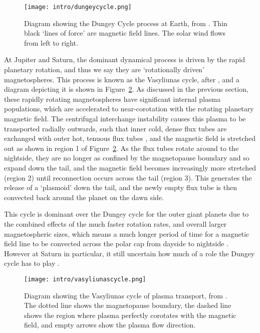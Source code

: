 \begin{figure}
\centering
\noindent\texttt{[image: intro/dungeycycle.png]}
\caption[Diagram of the Dungey cycle.]{Diagram showing the Dungey Cycle process at Earth, from \citet{dungey1961}. Thin black `lines of force' are magnetic field lines. The solar wind flows from left to right.}
\label{intro:fig:dungeycycle}
\end{figure}

At Jupiter and Saturn, the dominant dynamical process is driven by the rapid planetary rotation, and thus we say they are `rotationally driven' magnetospheres. This process is known as the Vasyliunas cycle, after \citet{vasyliunas1983}, and a diagram depicting it is shown in Figure~\ref{intro:fig:vasyliunascycle}. As discussed in the previous section, these rapidly rotating magnetospheres have significant internal plasma populations, which are accelerated to near-corotation with the rotating planetary magnetic field. The centrifugal interchange instability causes this plasma to be transported radially outwards, such that inner cold, dense flux tubes are exchanged with outer hot, tenuous flux tubes \citep{southwood1989}, and the magnetic field is stretched out as shown in region 1 of Figure~\ref{intro:fig:vasyliunascycle}. As the flux tubes rotate around to the nightside, they are no longer as confined by the magnetopause boundary and so expand down the tail, and the magnetic field becomes increasingly more stretched (region 2) until reconnection occurs across the tail (region 3). This generates the release of a `plasmoid' down the tail, and the newly empty flux tube is then convected back around the planet on the dawn side. 

This cycle is dominant over the Dungey cycle for the outer giant planets due to the combined effects of the much faster rotation rates, and overall larger magnetospheric sizes, which means a much longer period of time for a magnetic field line to be convected across the polar cap from dayside to nightside \citep{forsyth2010}. However at Saturn in particular, it still uncertain how much of a role the Dungey cycle has to play \citep[e.g.][]{cowley2005}.

\begin{figure}
\centering
\noindent\texttt{[image: intro/vasyliunascycle.png]}
\caption[Diagram of the Vasyliunas cycle.]{Diagram showing the Vasyliunas cycle of plasma transport, from \citet{vasyliunas1983}. The dotted line shows the magnetopause boundary, the dashed line shows the region where plasma perfectly corotates with the magnetic field, and empty arrows show the plasma flow direction.}
\label{intro:fig:vasyliunascycle}
\end{figure}

